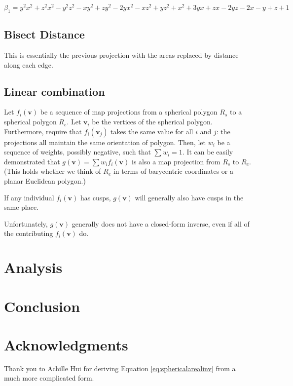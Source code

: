 \documentclass{amsart}[12pt]
\begin{document}
\begin{equation}
	\beta_1 = y^2  x^2 + z^2  x^2 - y^2  z^2
	- x  y^2 + z  y^2
	- 2yx^2 - xz^2 + yz^2 + x^2
	+ 3yx + zx - 2yz
	- 2x - y + z + 1
\end{equation}


\subsection{Bisect Distance}
This is essentially the previous projection with the areas replaced by distance along each edge.

\subsection{Linear combination}

Let $f_i (\mathbf v)$ be a sequence of map projections from a spherical
polygon $R_s$
to a spherical polygon $R_e$.
Let $\mathbf v_i$ be the
vertices of the spherical polygon. Furthermore, require that $f_i(\mathbf v_j)$
takes the same value for all $i$ and $j$: the projections all maintain the same
orientation of polygon. Then, let $w_i$ be a sequence of weights, possibly
negative, such that $\sum w_i = 1$. It can be easily demonstrated that
$g(\mathbf v) = \sum w_i f_i(\mathbf v)$ is also a map projection from $R_s$ to
$R_e$. (This holds whether we think of $R_e$ in terms of barycentric coordinates
or a planar Euclidean polygon.)

If any individual $f_i(\mathbf v)$ has cusps, $g(\mathbf v)$ will generally also have cusps in the same place. 

Unfortunately, $g(\mathbf v)$ generally does not have a closed-form inverse, even if all
of the contributing $f_i(\mathbf v)$ do.

\section{Analysis}

\section{Conclusion}

\section{Acknowledgments}
Thank you to Achille Hui for deriving Equation \ref{eq:sphericalarealinv} from a much more complicated form.



\end{document}
